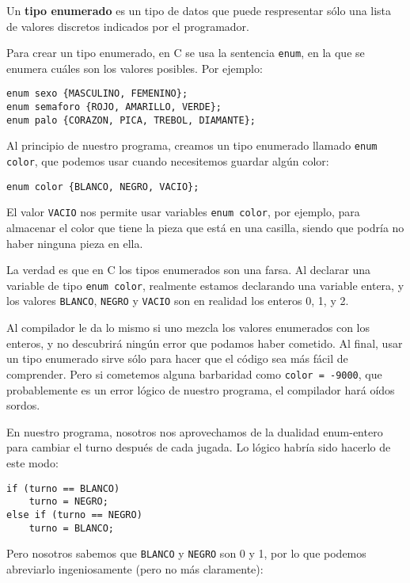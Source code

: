 Un \textbf{tipo enumerado} es un tipo de datos que puede respresentar
sólo una lista de valores discretos indicados por el programador.

Para crear un tipo enumerado, en C se usa la sentencia \lstinline!enum!,
en la que se enumera cuáles son los valores posibles. Por ejemplo:

\begin{lstlisting}
enum sexo {MASCULINO, FEMENINO};
enum semaforo {ROJO, AMARILLO, VERDE};
enum palo {CORAZON, PICA, TREBOL, DIAMANTE};
\end{lstlisting}

Al principio de nuestro programa, creamos un tipo enumerado llamado
\lstinline!enum color!, que podemos usar cuando necesitemos guardar
algún color:

\begin{lstlisting}
enum color {BLANCO, NEGRO, VACIO};
\end{lstlisting}

El valor \lstinline!VACIO! nos permite usar variables
\lstinline!enum color!, por ejemplo, para almacenar el color que tiene
la pieza que está en una casilla, siendo que podría no haber ninguna
pieza en ella.

La verdad es que en C los tipos enumerados son una farsa. Al declarar
una variable de tipo \lstinline!enum color!, realmente estamos
declarando una variable entera, y los valores \lstinline!BLANCO!,
\lstinline!NEGRO! y \lstinline!VACIO! son en realidad los enteros 0, 1,
y 2.

Al compilador le da lo mismo si uno mezcla los valores enumerados con
los enteros, y no descubrirá ningún error que podamos haber cometido. Al
final, usar un tipo enumerado sirve sólo para hacer que el código sea
más fácil de comprender. Pero si cometemos alguna barbaridad como
\lstinline!color = -9000!, que probablemente es un error lógico de
nuestro programa, el compilador hará oídos sordos.

En nuestro programa, nosotros nos aprovechamos de la dualidad
enum-entero para cambiar el turno después de cada jugada. Lo lógico
habría sido hacerlo de este modo:

\begin{lstlisting}
if (turno == BLANCO)
    turno = NEGRO;
else if (turno == NEGRO)
    turno = BLANCO;
\end{lstlisting}

Pero nosotros sabemos que \lstinline!BLANCO! y \lstinline!NEGRO! son 0 y
1, por lo que podemos abreviarlo ingeniosamente (pero no más
claramente):


